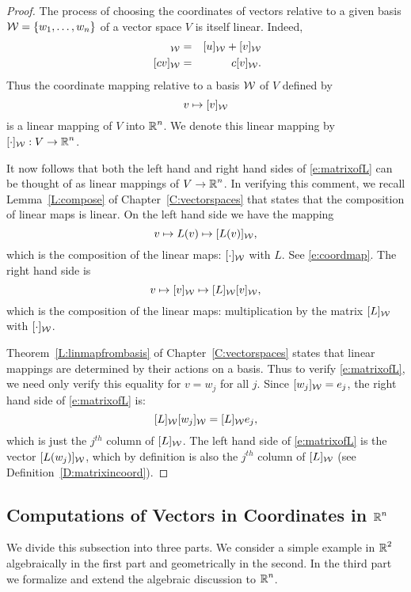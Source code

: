 \documentclass{ximera}
\begin{document}
\begin{proof} The process of choosing the coordinates of vectors relative to
a given basis ${\cal W} =\{w_1,\ldots,w_n\}$ of a vector space $V$
is itself linear.  Indeed,
\begin{eqnarray*}
[u+v]_{\cal W} & = & [u]_{\cal W} + [v]_{\cal W} \\
  \; [cv]_{\cal W}  & = &  c[v]_{\cal W}.
\end{eqnarray*}
Thus the coordinate mapping relative to a basis ${\cal W}$ of $V$
defined by
\begin{equation}  \label{e:coordmap}
v \mapsto [v]_{\cal W}
\end{equation}
is a linear mapping of $V$ into $\mbox{$\Bbb{R}$}^n$.  We denote this linear
mapping by $[\cdot]_{\cal W}:V\to\mbox{$\Bbb{R}$}^n$.


It now follows that both the left hand and right hand sides of
\eqref{e:matrixofL} can be thought of as linear mappings of $V\to\mbox{$\Bbb{R}$}^n$.
In verifying this comment, we recall Lemma~\ref{L:compose} of
Chapter~\ref{C:vectorspaces} that states that the composition of linear
maps is linear.  On the left hand side we have the mapping
\[
v \mapsto L(v) \mapsto [L(v)]_{\cal W},
\]
which is the composition of the linear maps: $[\cdot]_{\cal W}$ with
$L$.  See \eqref{e:coordmap}.  The right hand side is
\[
v \mapsto [v]_{\cal W} \mapsto [L]_{\cal W} [v]_{\cal W},
\]
which is the composition of the linear maps:  multiplication by the
matrix $[L]_{\cal W}$ with $[\cdot]_{\cal W}$.

Theorem~\ref{L:linmapfrombasis} of Chapter~\ref{C:vectorspaces}
states that linear mappings are determined by their actions on a
basis.  Thus to verify \eqref{e:matrixofL}, we need only verify this
equality for $v=w_j$ for all $j$.  Since $[w_j]_{\cal W}=e_j$, the right
hand side of \eqref{e:matrixofL} is:
\[
[L]_{\cal W} [w_j]_{\cal W} =  [L]_{\cal W} e_j,
\]
which is just the $j^{th}$ column of $[L]_{\cal W}$.  The left hand side of
\eqref{e:matrixofL} is the vector $[L(w_j)]_{\cal W}$, which by definition is
also the $j^{th}$ column of $[L]_{\cal W}$
(see Definition~\ref{D:matrixincoord}).    \end{proof}


\subsection*{Computations of Vectors in Coordinates in $\mbox{$\Bbb{R}$}^n$}

We divide this subsection into three parts.  We consider a simple example in
$\mbox{$\Bbb{R}$}^2$ algebraically in the first part and geometrically in the second.  In
the third part we formalize and extend the algebraic discussion to $\mbox{$\Bbb{R}$}^n$.
\end{document}
